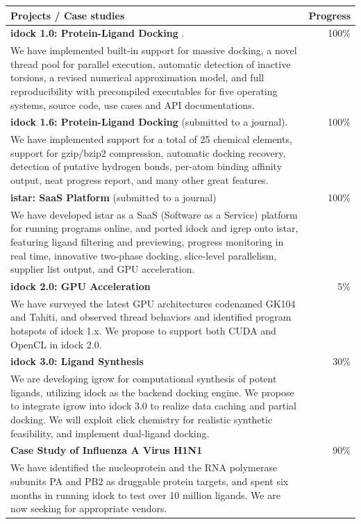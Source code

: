 \begin{table}
\centering
\begin{tabular*}
{\linewidth}
{@{\extracolsep{\fill}}p{}r}
\toprule
Projects / Case studies & Progress \\
\midrule
\textbf{idock 1.0: Protein-Ligand Docking} \citep{1153}. & 100\% \\
We have implemented built-in support for massive docking, a novel thread pool for parallel execution, automatic detection of inactive torsions, a revised numerical approximation model, and full reproducibility with precompiled executables for five operating systems, source code, use cases and API documentations. & \\
\textbf{idock 1.6: Protein-Ligand Docking} (submitted to a journal). & 100\% \\
We have implemented support for a total of 25 chemical elements, support for gzip/bzip2 compression, automatic docking recovery, detection of putative hydrogen bonds, per-atom binding affinity output, neat progress report, and many other great features. & \\
\textbf{istar: SaaS Platform} (submitted to a journal) & 100\% \\
We have developed istar as a SaaS (Software as a Service) platform for running programs online, and ported idock and igrep onto istar, featuring ligand filtering and previewing, progress monitoring in real time, innovative two-phase docking, slice-level parallelism, supplier list output, and GPU acceleration. & \\
\textbf{idock 2.0: GPU Acceleration} & 5\% \\
We have surveyed the latest GPU architectures codenamed GK104 and Tahiti, and observed thread behaviors and identified program hotspots of idock 1.x. We propose to support both CUDA and OpenCL in idock 2.0. & \\
\textbf{idock 3.0: Ligand Synthesis} & 30\% \\
We are developing igrow for computational synthesis of potent ligands, utilizing idock as the backend docking engine. We propose to integrate igrow into idock 3.0 to realize data caching and partial docking. We will exploit click chemistry for realistic synthetic feasibility, and implement dual-ligand docking. & \\
\textbf{Case Study of Influenza A Virus H1N1} & 90\% \\
We have identified the nucleoprotein and the RNA polymerase subunits PA and PB2 as druggable protein targets, and spent six months in running idock to test over 10 million ligands. We are now seeking for appropriate vendors. & \\

\end{tabular*}
\end{table}
